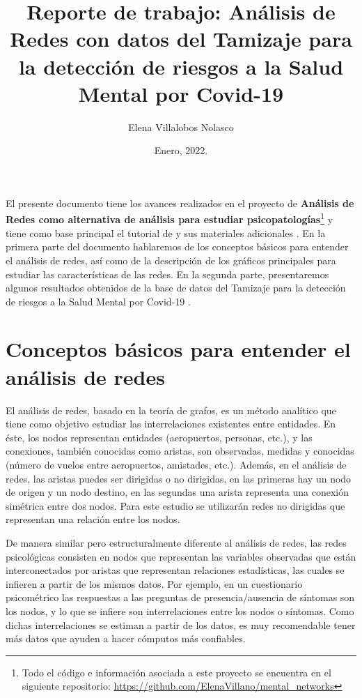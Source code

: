 \documentclass[11pt,spanish]{article}\usepackage[]{graphicx}\usepackage[]{color}
\title{\huge{Reporte de trabajo: Análisis de Redes con datos del Tamizaje para la detección de riesgos a la Salud Mental por Covid-19}}
\author[ ]{Elena Villalobos Nolasco}
\date{Enero, 2022.}
\begin{document}
\maketitle


El presente documento tiene los avances realizados en el proyecto de {\bf Análisis de Redes como alternativa de análisis para estudiar psicopatologías}\footnote{Todo el código e información asociada a este proyecto se encuentra en el siguiente repositorio: \url{https://github.com/ElenaVillano/mental_networks}} y tiene como base principal el tutorial de \cite{main_tutorial} y sus materiales adicionales \citep{epskamp2018estimating}. En la primera parte del documento hablaremos de los conceptos básicos para entender el análisis de redes, así como de la descripción de los gráficos principales para estudiar las características de las redes. En la segunda parte, presentaremos algunos resultados obtenidos de la base de datos del Tamizaje para la detección de riesgos a la Salud Mental por Covid-19 \citep{morales2021mental, chaine2020condiciones}. 


\section{Conceptos básicos para entender el análisis de redes}

El análisis de redes, basado en la teoría de grafos, es un método analítico que tiene como objetivo estudiar las interrelaciones existentes entre entidades. En éste, los nodos representan entidades (aeropuertos, personas, etc.), y las conexiones, también conocidas como aristas, son observadas, medidas y conocidas (número de vuelos entre aeropuertos, amistades, etc.). Además, en el análisis de redes, las aristas puedes ser dirigidas o no dirigidas, en las primeras hay un nodo de origen y un nodo destino, en las segundas una arista representa una conexión simétrica entre dos nodos. Para este estudio se utilizarán redes no dirigidas que representan una relación entre los nodos. 

De manera similar pero estructuralmente diferente al análisis de redes, las redes psicológicas consisten en nodos que representan las variables observadas que están interconectados por aristas que representan relaciones estadísticas, las cuales se infieren a partir de los mismos datos. Por ejemplo, en un cuestionario psicométrico las respuestas a las preguntas de presencia/ausencia de síntomas son los nodos, y lo que se infiere son interrelaciones entre los nodos o síntomas. Como dichas interrelaciones se estiman a partir de los datos, es muy recomendable tener más datos que ayuden a hacer cómputos más confiables.
\end{document}
